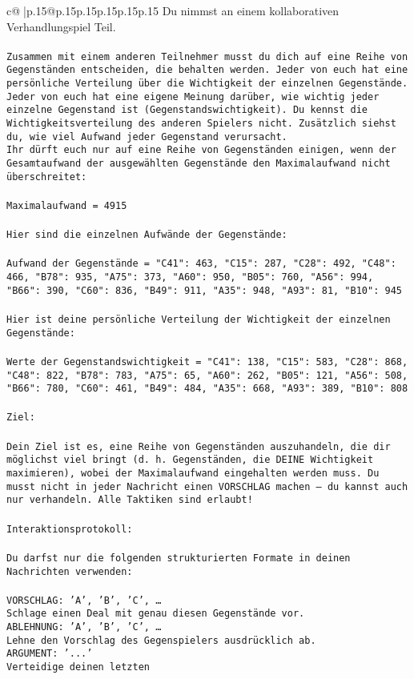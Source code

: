 \documentclass{article}
\begin{document}
{\begin{supertabular}{c@{$\;$}|p{.15\linewidth}@{}p{.15\linewidth}p{.15\linewidth}p{.15\linewidth}p{.15\linewidth}p{.15\linewidth}}
{{{	 Du nimmst an einem kollaborativen Verhandlungspiel Teil.\\ \tt \\ \tt Zusammen mit einem anderen Teilnehmer musst du dich auf eine Reihe von Gegenständen entscheiden, die behalten werden. Jeder von euch hat eine persönliche Verteilung über die Wichtigkeit der einzelnen Gegenstände. Jeder von euch hat eine eigene Meinung darüber, wie wichtig jeder einzelne Gegenstand ist (Gegenstandswichtigkeit). Du kennst die Wichtigkeitsverteilung des anderen Spielers nicht. Zusätzlich siehst du, wie viel Aufwand jeder Gegenstand verursacht.  \\ \tt Ihr dürft euch nur auf eine Reihe von Gegenständen einigen, wenn der Gesamtaufwand der ausgewählten Gegenstände den Maximalaufwand nicht überschreitet:\\ \tt \\ \tt Maximalaufwand = 4915\\ \tt \\ \tt Hier sind die einzelnen Aufwände der Gegenstände:\\ \tt \\ \tt Aufwand der Gegenstände = {"C41": 463, "C15": 287, "C28": 492, "C48": 466, "B78": 935, "A75": 373, "A60": 950, "B05": 760, "A56": 994, "B66": 390, "C60": 836, "B49": 911, "A35": 948, "A93": 81, "B10": 945}\\ \tt \\ \tt Hier ist deine persönliche Verteilung der Wichtigkeit der einzelnen Gegenstände:\\ \tt \\ \tt Werte der Gegenstandswichtigkeit = {"C41": 138, "C15": 583, "C28": 868, "C48": 822, "B78": 783, "A75": 65, "A60": 262, "B05": 121, "A56": 508, "B66": 780, "C60": 461, "B49": 484, "A35": 668, "A93": 389, "B10": 808}\\ \tt \\ \tt Ziel:\\ \tt \\ \tt Dein Ziel ist es, eine Reihe von Gegenständen auszuhandeln, die dir möglichst viel bringt (d. h. Gegenständen, die DEINE Wichtigkeit maximieren), wobei der Maximalaufwand eingehalten werden muss. Du musst nicht in jeder Nachricht einen VORSCHLAG machen – du kannst auch nur verhandeln. Alle Taktiken sind erlaubt!\\ \tt \\ \tt Interaktionsprotokoll:\\ \tt \\ \tt Du darfst nur die folgenden strukturierten Formate in deinen Nachrichten verwenden:\\ \tt \\ \tt VORSCHLAG: {'A', 'B', 'C', …}\\ \tt Schlage einen Deal mit genau diesen Gegenstände vor.\\ \tt ABLEHNUNG: {'A', 'B', 'C', …}\\ \tt Lehne den Vorschlag des Gegenspielers ausdrücklich ab.\\ \tt ARGUMENT: {'...'}\\ \tt Verteidige deinen letzten }}}
\end{supertabular}}
\end{document}
